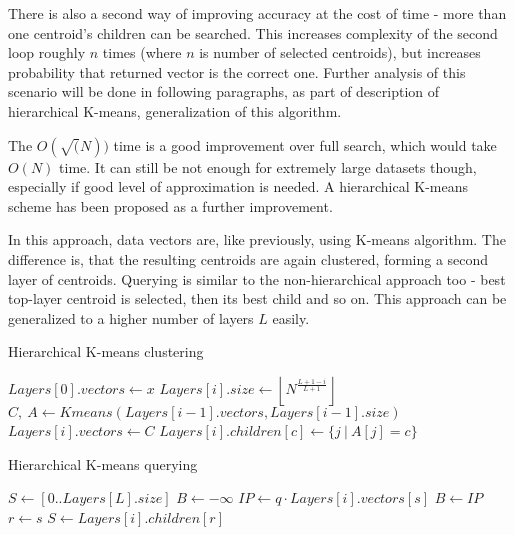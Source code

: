 There is also a second way of improving accuracy at the cost of time - more
than one centroid's children can be searched. This increases complexity of the
second loop roughly $n$ times (where $n$ is number of selected centroids),
but increases probability that returned vector is the correct one. Further
analysis of this scenario will be done in following paragraphs, as part
of description of hierarchical K-means, generalization of this algorithm.


\bigskip


The $O(\sqrt(N))$ time is a good improvement over full search, which would
take $O(N)$ time. It can still be not enough for extremely large datasets
though, especially if good level of approximation is needed. A hierarchical
K-means scheme has been proposed as a further improvement.

In this approach, data vectors are, like previously, using K-means algorithm.
The difference is, that the resulting centroids are again clustered, forming
a second layer of centroids. Querying is similar to the non-hierarchical
approach too - best top-layer centroid is selected, then its best child and
so on. This approach can be generalized to a higher number of layers $L$ 
easily.


\begin{algorithm}[H]
	\caption{Hierarchical K-means clustering}
	\begin{algorithmic}
		\State $ Layers[0].vectors \gets x $
			\State $ Layers[i].size \gets \left \lfloor N^{\frac{L + 1 - i}{L + 1}} \right \rfloor $
			\State $ C,\ A \gets Kmeans(Layers[i - 1].vectors, Layers[i - 1].size) $
			\State $ Layers[i].vectors \gets C $
				\State $ Layers[i].children[c] \gets \{ j\ |\ A[j] = c \} $
			\EndFor
		\EndFor
		\State {}
	\end{algorithmic}
\end{algorithm}

\begin{algorithm}[H]
	\caption{Hierarchical K-means querying}
	\begin{algorithmic}
		\State $ S \gets [0..Layers[L].size] $
		\For{$ i = L,\dots,0 $}
			\State $ B \gets -\infty $
			\For{$ s \in S $}
				\State $ IP \gets q \cdot Layers[i].vectors[s] $
				\If{$ IP > B $}
					\State $ B \gets IP $
					\State $ r \gets s $
				\EndIf
			\EndFor
			\If{$ i = 0 $}
				\State \Return {$ r $}
			\EndIf
			\State $ S \gets Layers[i].children[r] $
		\EndFor
	\end{algorithmic}
\end{algorithm}

